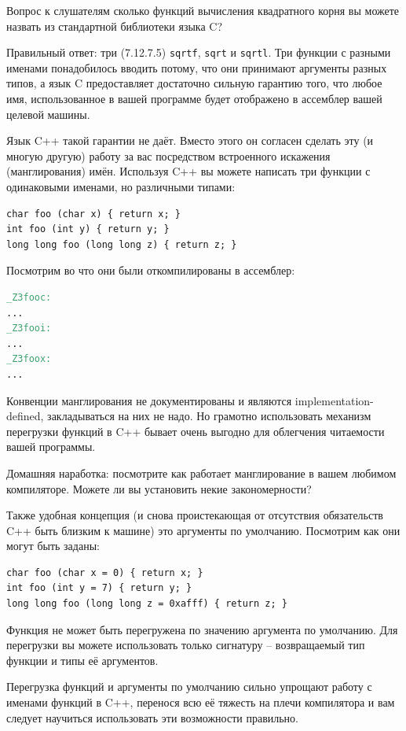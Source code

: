\documentclass[a4paper,12pt,oneside]{article}
\begin{document}
Вопрос к слушателям сколько функций вычисления квадратного корня вы можете назвать из стандартной библиотеки языка C?

Правильный ответ: три (7.12.7.5) \lstinline!sqrtf!, \lstinline!sqrt! и \lstinline!sqrtl!. Три функции с разными именами понадобилось вводить потому, что они принимают аргументы разных типов, а язык C предоставляет достаточно сильную гарантию того, что любое имя, использованное в вашей программе будет отображено в ассемблер вашей целевой машины.

Язык C++ такой гарантии не даёт. Вместо этого он согласен сделать эту (и многую другую) работу за вас посредством встроенного искажения (манглирования) имён. Используя C++ вы можете написать три функции с одинаковыми именами, но различными типами:

\begin{lstlisting}
char foo (char x) { return x; }
int foo (int y) { return y; }
long long foo (long long z) { return z; }
\end{lstlisting}

Посмотрим во что они были откомпилированы в ассемблер:

\begin{lstlisting}[language=make]
_Z3fooc:
...
_Z3fooi:
...
_Z3foox:
...
\end{lstlisting}

Конвенции манглирования не документированы и являются implementation-defined, закладываться на них не надо. Но грамотно использовать механизм перегрузки функций в C++ бывает очень выгодно для облегчения читаемости вашей программы.

Домашняя наработка: посмотрите как работает манглирование в вашем любимом компиляторе. Можете ли вы установить некие закономерности?

Также удобная концепция (и снова проистекающая от отсутствия обязательств C++ быть близким к машине) это аргументы по умолчанию. Посмотрим как они могут быть заданы:

\begin{lstlisting}
char foo (char x = 0) { return x; }
int foo (int y = 7) { return y; }
long long foo (long long z = 0xafff) { return z; }
\end{lstlisting}

Функция не может быть перегружена по значению аргумента по умолчанию. Для перегрузки вы можете использовать только сигнатуру – возвращаемый тип функции и типы её аргументов.

Перегрузка функций и аргументы по умолчанию сильно упрощают работу с именами функций в C++, перенося всю её тяжесть на плечи компилятора и вам следует научиться использовать эти возможности правильно.
\end{document}
